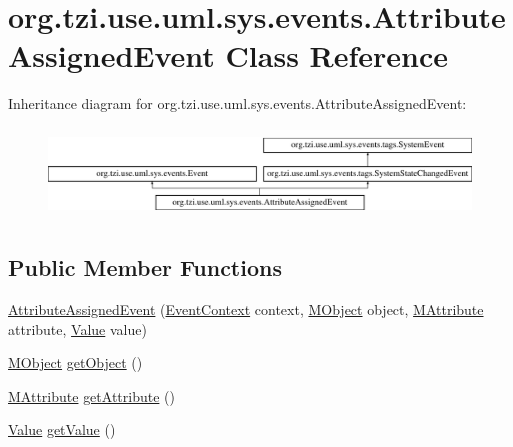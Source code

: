 \hypertarget{classorg_1_1tzi_1_1use_1_1uml_1_1sys_1_1events_1_1_attribute_assigned_event}{\section{org.\-tzi.\-use.\-uml.\-sys.\-events.\-Attribute\-Assigned\-Event Class Reference}
\label{classorg_1_1tzi_1_1use_1_1uml_1_1sys_1_1events_1_1_attribute_assigned_event}
}
Inheritance diagram for org.\-tzi.\-use.\-uml.\-sys.\-events.\-Attribute\-Assigned\-Event\-:\begin{figure}[H]
\begin{center}
\leavevmode
\includegraphics[height=2.413793cm]{classorg_1_1tzi_1_1use_1_1uml_1_1sys_1_1events_1_1_attribute_assigned_event}
\end{center}
\end{figure}
\subsection*{Public Member Functions}
\begin{DoxyCompactItemize}
\item 
\hyperlink{classorg_1_1tzi_1_1use_1_1uml_1_1sys_1_1events_1_1_attribute_assigned_event_a6067080e3faf259f19cdf79d8a589a20}{Attribute\-Assigned\-Event} (\hyperlink{enumorg_1_1tzi_1_1use_1_1uml_1_1sys_1_1events_1_1tags_1_1_event_context}{Event\-Context} context, \hyperlink{interfaceorg_1_1tzi_1_1use_1_1uml_1_1sys_1_1_m_object}{M\-Object} object, \hyperlink{classorg_1_1tzi_1_1use_1_1uml_1_1mm_1_1_m_attribute}{M\-Attribute} attribute, \hyperlink{classorg_1_1tzi_1_1use_1_1uml_1_1ocl_1_1value_1_1_value}{Value} value)
\item 
\hyperlink{interfaceorg_1_1tzi_1_1use_1_1uml_1_1sys_1_1_m_object}{M\-Object} \hyperlink{classorg_1_1tzi_1_1use_1_1uml_1_1sys_1_1events_1_1_attribute_assigned_event_a5cf93cbfc9e45bb899311e5d519d9a19}{get\-Object} ()
\item 
\hyperlink{classorg_1_1tzi_1_1use_1_1uml_1_1mm_1_1_m_attribute}{M\-Attribute} \hyperlink{classorg_1_1tzi_1_1use_1_1uml_1_1sys_1_1events_1_1_attribute_assigned_event_ad2ffc9ab655426d1887dde7b60a15002}{get\-Attribute} ()
\item 
\hyperlink{classorg_1_1tzi_1_1use_1_1uml_1_1ocl_1_1value_1_1_value}{Value} \hyperlink{classorg_1_1tzi_1_1use_1_1uml_1_1sys_1_1events_1_1_attribute_assigned_event_a9f84810fb2e43941dff50ace72815e5d}{get\-Value} ()
\end{DoxyCompactItemize}


